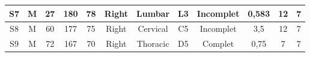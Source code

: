 \begin{landscape}
\begin{table}[h]
\begin{tabular}{|c|c|c|c|c|c|c|c|c|c|c|c|}
S7                                                     & M                                   & 27                                & 180                                       & 78                                        & Right                                                                                    & Lumbar                                                                                   & L3                                                                                         & Incomplet                                                                                   & 0,583                                                                                           & 12                                                                                         & 7                                                                                          \\ \hline
S8                                                     & M                                   & 60                                & 177                                       & 75                                        & Right                                                                                    & Cervical                                                                                 & C5                                                                                         & Incomplet                                                                                   & 3,5                                                                                             & 12                                                                                         & 7                                                                                          \\ \hline
S9                                                     & M                                   & 72                                & 167                                       & 70                                        & Right                                                                                    & Thoracic                                                                                 & D5                                                                                         & Complet                                                                                     & 0,75                                                                                            & 7                                                                                          & 7                                                                                          \\ \hline

\end{tabular}
\end{table}
\end{landscape}
